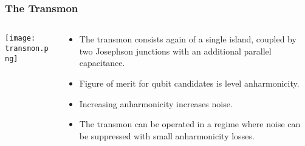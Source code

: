 \documentclass[xetex]{beamer}
\begin{document}
\begin{frame}
    \frametitle{The Transmon}
    \begin{columns}[c]
        \begin{column}{0.4\linewidth}
            \begin{block}{}
                \vspace{-0.5cm}
                \texttt{[image: transmon.png]}
            \end{block}
        \end{column}
        \begin{column}{0.6\linewidth}
            \begin{itemize}
                \item The transmon consists again of a single island, 
                        coupled by two Josephson junctions with an
                        additional parallel capacitance. 
                \item Figure of merit for qubit candidates is level 
                        anharmonicity. 
                \item Increasing anharmonicity increases noise.
                \item The transmon can be operated in a regime 
                        where noise can be suppressed with small 
                        anharmonicity losses. 
            \end{itemize}
        \end{column}
    \end{columns}
\end{frame}
\end{document}
